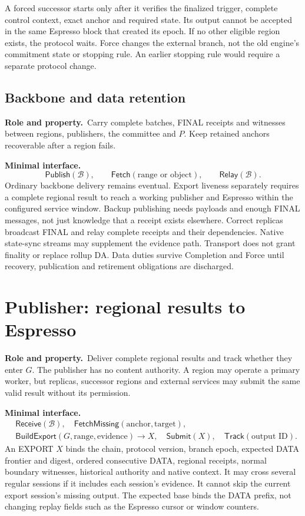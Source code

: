 \documentclass[11pt,a4paper]{article}
\newcommand{\api}[1]{\ensuremath{\mathsf{#1}}}
\newcommand{\role}{\textbf{Role and property.}\ }
\newcommand{\iface}{\textbf{Minimal interface.}\ }
\begin{document}
A forced successor starts only after it verifies the finalized trigger,
complete control context, exact anchor and required state. Its output
cannot be accepted in the same Espresso block that created its epoch.
If no other eligible region exists, the protocol waits. Force changes
the external branch, not the old engine's commitment state or stopping
rule. An earlier stopping rule would require a separate protocol change.

\subsection{Backbone and data retention}
\role Carry complete batches, FINAL receipts and witnesses between
regions, publishers, the committee and $P$. Keep retained anchors
recoverable after a region fails.

\iface
\[
 \api{Publish}(\mathcal B),\qquad
 \api{Fetch}(\text{range or object}),\qquad
 \api{Relay}(\mathcal B).
\]
Ordinary backbone delivery remains eventual. Export liveness separately
requires a complete regional result to reach a working publisher and
Espresso within the configured service window. Backup publishing needs
payloads and enough FINAL messages, not just knowledge that a receipt
exists elsewhere. Correct replicas broadcast FINAL and relay complete
receipts and their dependencies. Native state-sync streams may supplement
the evidence path. Transport does not grant finality or replace rollup
DA. Data duties survive Completion and Force until recovery, publication
and retirement obligations are discharged.

\section{Publisher: regional results to Espresso}\label{sec:publisher}
\role Deliver complete regional results and track whether they enter
$G$. The publisher has no content authority. A region may operate a
primary worker, but replicas, successor regions and external services
may submit the same valid result without its permission.

\iface
\[
\begin{aligned}
 &\api{Receive}(\mathcal B),\quad
   \api{FetchMissing}(\text{anchor},\text{target}),\\
 &\api{BuildExport}(G,\text{range},\text{evidence})\to X,\quad
   \api{Submit}(X),\quad \api{Track}(\text{output ID}).
\end{aligned}
\]
An EXPORT $X$ binds the chain, protocol version, branch epoch, expected
DATA frontier and digest, ordered consecutive DATA, regional receipts, normal
boundary witnesses, historical authority and native context. It may
cross several regular sessions if it includes each session's evidence.
It cannot skip the current export session's missing output. The expected
base binds the DATA prefix, not changing replay fields such as the
Espresso cursor or window counters.
\end{document}
